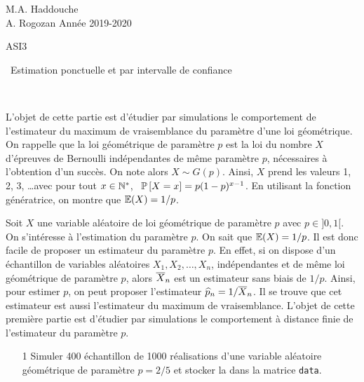 \documentclass[a4paper,reqno,11pt]{article}
\def\Theme{Estimation ponctuelle et par intervalle de confiance}
\begin{document}
\noindent
{\large M.A. Haddouche \\ A. Rogozan \hfill Année 2019-2020} 
\vspace{4ex}

\begin{center}
{\Large ASI3 } \\
\vspace{1ex}

{\bf\large 

\  \Theme}
\end{center}
\vspace{1ex}


\begin{partie}{\sf \ 
		\vspace{1ex} 
		
L'objet de cette partie est d'étudier par simulations
le comportement de l'estimateur du maximum de vraisemblance
du paramètre d'une loi géométrique.
On rappelle que la loi géométrique de paramètre
$p$ est la loi du nombre $X$ d'épreuves de Bernoulli
indépendantes de même paramètre $p$,
nécessaires à l'obtention d'un succès.
On note alors $X\sim G(p)$.
Ainsi, $X$ prend les valeurs 1, 2, 3, \ldots avec
pour tout $x\in \mathbb{N}^*$, \
$\mathbb{P}\left[ X = x \right] = p (1-p)^{x-1}$.
En utilisant la fonction génératrice, on montre
que ${\mathbb{E}}(X) = {1}/{p}$.


		
		Soit $X$ une variable aléatoire 
		de loi géométrique de paramètre $p$ avec $p \in ]0,1[$.
		\noindent
		On s'intéresse à l'estimation du paramètre $p$.
		On sait que ${\mathbb{E}}(X) = {1}/{p}$.
		Il est donc facile  de proposer un estimateur du paramètre $p$.
		En effet, si on dispose d'un échantillon
		de variables aléatoires $X_1, X_2, \ldots, X_n$, indépendantes et de même loi
		géométrique de paramètre $p$, alors
		$\overline{X}_n$ est un estimateur sans biais de ${1}/{p}$.
		Ainsi, pour estimer $p$, on peut proposer l'estimateur
		$\widehat p_n = {1}/{\overline{X}_n}$.
		Il se trouve que cet estimateur est aussi 
		l'estimateur du maximum de vraisemblance.
		L'objet de cette première partie est d'étudier par simulations le comportement à distance finie de l'estimateur du paramètre $p$.
		
			\vspace{4ex}
			
		\begin{itemize}
			\item[1] Simuler 400 échantillon de 1000 réalisations d'une variable aléatoire géométrique de paramètre $p=2/5$ et stocker la dans la matrice \verb|data|. 
			

\end{itemize}}
\end{partie}
\end{document}
